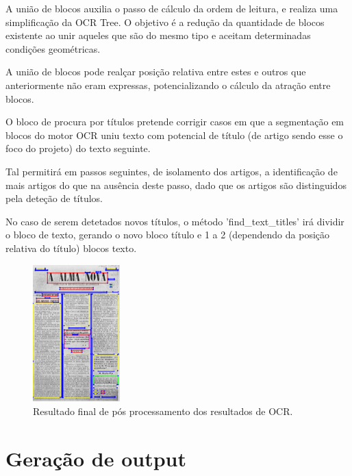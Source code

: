 
A união de blocos auxilia o passo de cálculo da ordem de leitura, e realiza uma simplificação da OCR Tree. O objetivo é a redução da quantidade de blocos existente ao unir aqueles que são do mesmo tipo e aceitam determinadas condições geométricas.

A união de blocos pode realçar posição relativa entre estes e outros que anteriormente não eram expressas, potencializando o cálculo da atração entre blocos.





O bloco de procura por títulos pretende corrigir casos em que a segmentação em blocos do motor OCR uniu texto com potencial de título (de artigo sendo esse o foco do projeto) do texto seguinte.

Tal permitirá em passos seguintes, de isolamento dos artigos, a identificação de mais artigos do que na ausência deste passo, dado que os artigos são distinguidos pela deteção de títulos.

No caso de serem detetados novos títulos, o método 'find\_text\_titles' irá dividir o bloco de texto, gerando o novo bloco título e 1 a 2 (dependendo da posição relativa do título) blocos texto.

\begin{figure}[H]
	\centering
	\includegraphics[width=0.3\textwidth]{images/ilustracoes/pipeline_final_example.png}
	\caption{Resultado final de pós processamento dos resultados de OCR.}
	\label{fig:pipeline_final_example}
\end{figure}



\section{Geração de output}

